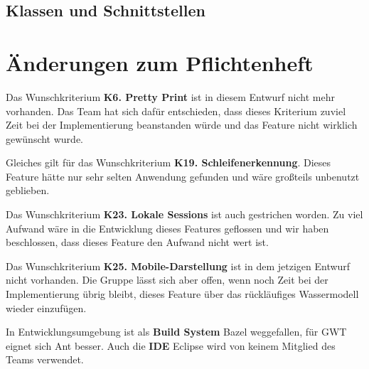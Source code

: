 \documentclass[parskip=full,11pt,twoside]{scrbook}
\begin{document}
\subsection{Klassen und Schnittstellen}
\pagebreak

\section{Änderungen zum Pflichtenheft}
Das Wunschkriterium \textbf{K6. Pretty Print} ist in diesem Entwurf nicht mehr vorhanden. Das Team hat sich dafür entschieden, dass dieses Kriterium zuviel Zeit bei der Implementierung beanstanden würde und das Feature nicht wirklich gewünscht wurde.

Gleiches gilt für das Wunschkriterium \textbf{K19. Schleifenerkennung}. Dieses Feature hätte nur sehr selten Anwendung gefunden und wäre großteils unbenutzt geblieben.

Das Wunschkriterium \textbf{K23. Lokale Sessions} ist auch gestrichen worden. Zu viel Aufwand wäre in die Entwicklung dieses Features geflossen und wir haben beschlossen, dass dieses Feature den Aufwand nicht wert ist.

Das Wunschkriterium \textbf{K25. Mobile-Darstellung} ist in dem jetzigen Entwurf nicht vorhanden. Die Gruppe lässt sich aber offen, wenn noch Zeit bei der Implementierung übrig bleibt, dieses Feature über das rückläufiges Wassermodell wieder einzufügen.

In Entwicklungsumgebung ist als \textbf{Build System} Bazel weggefallen, für GWT eignet sich Ant besser.
Auch die \textbf{IDE} Eclipse wird von keinem Mitglied des Teams verwendet.
\end{document}
